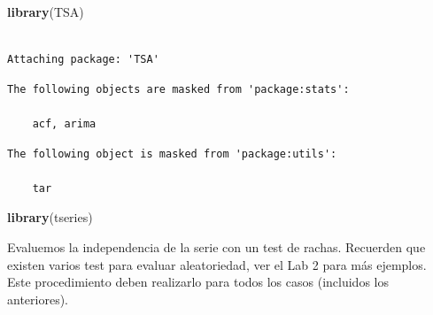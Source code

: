 \documentclass[
  12pt]{article}
\newenvironment{Shaded}{\begin{snugshade}}{\end{snugshade}}
\newcommand{\FunctionTok}[1]{\textcolor[rgb]{0.13,0.29,0.53}{\textbf{#1}}}
\newcommand{\NormalTok}[1]{#1}
\newcommand{\OtherTok}[1]{\textcolor[rgb]{0.56,0.35,0.01}{#1}}
\newcommand{\SpecialCharTok}[1]{\textcolor[rgb]{0.81,0.36,0.00}{\textbf{#1}}}
\begin{document}
\begin{Shaded}
\begin{Highlighting}[]
\FunctionTok{library}\NormalTok{(TSA)}
\end{Highlighting}
\end{Shaded}

\begin{verbatim}

Attaching package: 'TSA'
\end{verbatim}

\begin{verbatim}
The following objects are masked from 'package:stats':

    acf, arima
\end{verbatim}

\begin{verbatim}
The following object is masked from 'package:utils':

    tar
\end{verbatim}

\begin{Shaded}
\begin{Highlighting}[]
\FunctionTok{library}\NormalTok{(tseries)}
\end{Highlighting}
\end{Shaded}

Evaluemos la independencia de la serie con un test de rachas. Recuerden
que existen varios test para evaluar aleatoriedad, ver el Lab 2 para más
ejemplos. Este procedimiento deben realizarlo para todos los casos
(incluidos los anteriores).

\begin{Shaded}
\end{Shaded}

\begin{Shaded}
\end{Shaded}
\end{document}
